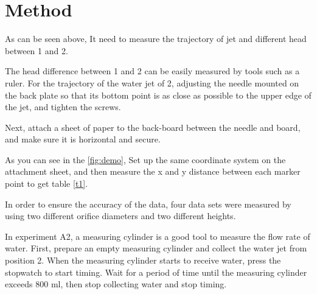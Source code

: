 \section{Method}

As can be seen above,  
It need to measure the trajectory of jet and different head between 1 and 2.  

The head difference between 1 and 2 can be easily measured by tools such as a ruler.
For the trajectory of the water jet of 2, 
adjusting the needle mounted on the back plate so that its bottom point is as close as possible 
to the upper edge of the jet, and tighten the screws.

Next, attach a sheet 
of paper to the back-board between the needle and board,
and make sure it is horizontal and secure.

As you can see in the \autoref{fig:demo},
Set up the same coordinate system on the attachment sheet, 
and then measure the x and y distance between each marker point to get table 
\ref{t1}.

In order to ensure the accuracy of the data, 
four data sets were measured by using two different orifice diameters and 
two different heights.

In experiment A2, a measuring cylinder is a good tool to measure the flow rate of water. 
First, prepare an empty measuring cylinder and collect the water jet from position 2. 
When the measuring cylinder starts to receive water, press the stopwatch to start timing. 
Wait for a period of time until the measuring cylinder exceeds 800 ml, 
then stop collecting water and stop timing.
















